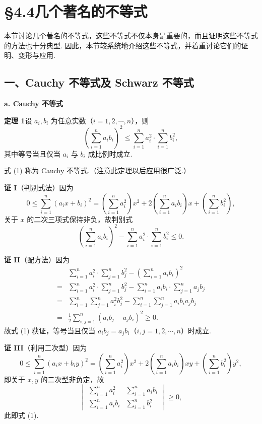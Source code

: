 \documentclass[UTF8,12pt,a4paper,fontset=fandol]{ctexart}
\begin{document}
\section*{§4.4\quad 几个著名的不等式}

本节讨论几个著名的不等式，这些不等式不仅本身是重要的，而且证明这些不等式的方法也十分典型. 因此，本节较系统地介绍这些不等式，并着重讨论它们的证明、变形与应用.

\subsection*{一、Cauchy 不等式及 Schwarz 不等式}

\noindent\textbf{a. Cauchy 不等式}

\noindent\textbf{定理 1}\quad 设 $a_i,b_i$ 为任意实数（$i=1,2,\cdots,n$），则
\[
\left(\sum_{i=1}^n a_i b_i\right)^2
\le \sum_{i=1}^n a_i^2\cdot \sum_{i=1}^n b_i^2, \tag{1}
\]
其中等号当且仅当 $a_i$ 与 $b_i$ 成比例时成立.

式 (1) 称为 Cauchy 不等式.（注意此定理以后应用很广泛.）

\noindent\textbf{证 I}\quad（判别式法）因为
\[
0\le \sum_{i=1}^n(a_i x+b_i)^2
=\left(\sum_{i=1}^n a_i^2\right)x^2
+2\left(\sum_{i=1}^n a_i b_i\right)x
+\left(\sum_{i=1}^n b_i^2\right),
\]
关于 $x$ 的二次三项式保持非负，故判别式
\[
\left(\sum_{i=1}^n a_i b_i\right)^2
-\sum_{i=1}^n a_i^2\cdot\sum_{i=1}^n b_i^2\le0.
\]

\noindent\textbf{证 II}\quad（配方法）因为
\[
\begin{aligned}
&\sum_{i=1}^n a_i^2\cdot\sum_{j=1}^n b_j^2
-\left(\sum_{i=1}^n a_i b_i\right)^2\\
={}&\sum_{i=1}^n a_i^2\cdot\sum_{j=1}^n b_j^2
-\sum_{i=1}^n a_i b_i\cdot\sum_{j=1}^n a_j b_j\\
={}&\sum_{i=1}^n\sum_{j=1}^n a_i^2b_j^2
-\sum_{i=1}^n\sum_{j=1}^n a_i b_i a_j b_j\\
={}&\frac12\sum_{i,j=1}^n(a_i b_j-a_j b_i)^2\ge0.
\end{aligned}
\]
故式 (1) 获证，等号当且仅当 $a_i b_j=a_j b_i$（$i,j=1,2,\cdots,n$）时成立.

\noindent\textbf{证 III}\quad（利用二次型）因为
\[
0\le\sum_{i=1}^n(a_i x+b_i y)^2
=\left(\sum_{i=1}^n a_i^2\right)x^2
+2\left(\sum_{i=1}^n a_i b_i\right)xy
+\left(\sum_{i=1}^n b_i^2\right)y^2,
\]
即关于 $x,y$ 的二次型非负定，故
\[
\begin{vmatrix}
\sum_{i=1}^n a_i^2&\sum_{i=1}^n a_i b_i\\
\sum_{i=1}^n a_i b_i&\sum_{i=1}^n b_i^2
\end{vmatrix}\ge0,
\]
此即式 (1).
\end{document}
